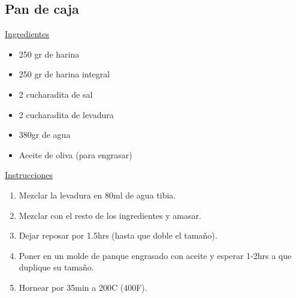 \subsection{Pan de caja}

\underline{Ingredientes}

\begin{itemize}
\item 250 gr de harina
\item 250 gr de harina integral
\item 2 cucharadita de sal
\item 2 cucharadita de levadura
\item 380gr de agua
\item Aceite de oliva (para engrasar)
\end{itemize}

\underline{Instrucciones}

\begin{enumerate}
\item Mezclar la levadura en 80ml de agua tibia.
\item Mezclar con el resto de los ingredientes y amasar.
\item Dejar reposar por \Sim1.5hrs (hasta que doble el tamaño).
\item Poner en un molde de panque engrasado con aceite y esperar 1-2hrs a que duplique su tamaño.
\item Hornear por \Sim35min a 200C (400F).
\end{enumerate}
